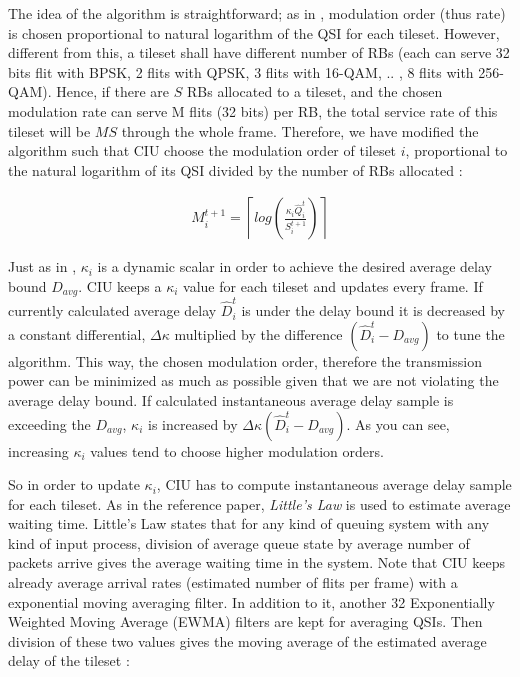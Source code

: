 The idea of the algorithm is straightforward; as in \cite{rajan2004delay}, modulation order (thus rate) is chosen proportional to natural logarithm of the QSI for each tileset. However, different from this, a tileset shall have different number of RBs (each can serve 32 bits flit with BPSK, 2 flits with QPSK, 3 flits with 16-QAM, .. , 8 flits with 256-QAM). Hence, if there are $S$ RBs allocated to a tileset, and the chosen modulation rate can serve M flits (32 bits) per RB, the total service rate of this tileset will be $MS$ through the whole frame. Therefore, we have modified the algorithm such that CIU choose the modulation order  of tileset $i$, proportional to the natural logarithm of its QSI divided by the number of RBs allocated :


\begin{align}
 M_{i}^{t+1} = \left \lceil log \left( \frac{\kappa_{i}{\hat{Q}}_{i}^{t}}{S_{i}^{t+1}} \right) \right \rceil 
\end{align}   

Just as in \cite{rajan2004delay}, $\kappa_{i}$ is a dynamic scalar in order to achieve the desired average delay bound $D_{avg}$. CIU keeps a $\kappa_{i}$ value for each tileset and updates every frame. If currently calculated average delay ${{\hat{D}}_{i}^{t}}$ is under the delay bound it is decreased by a constant differential, $\Delta \kappa$ multiplied by the difference $({{\hat{D}}_{i}^{t}}-D_{avg})$ to tune the algorithm. This way, the chosen modulation order, therefore the transmission power can be minimized as much as possible given that we are not violating the average delay bound. If calculated instantaneous average delay sample is exceeding the $D_{avg}$, $\kappa_{i}$ is increased by $\Delta \kappa ({{\hat{D}}_{i}^{t}}-D_{avg})$. As you can see, increasing $\kappa_{i}$ values tend to choose higher modulation orders. 

So in order to update  $\kappa_{i}$, CIU has to compute instantaneous average delay sample for each tileset. As in the reference paper, \textit{Little's Law} \cite{rajan2004delay} is used to estimate average waiting time. Little's Law states that for any kind of queuing system with any kind of input process, division of average queue state by average number of packets arrive gives the average waiting time in the system. Note that CIU keeps already average arrival rates (estimated number of flits per frame) with a exponential moving averaging filter. In addition to it, another 32 Exponentially Weighted Moving Average (EWMA) filters are kept for averaging QSIs. Then division of these two values gives the moving average of the estimated average delay of the tileset :

